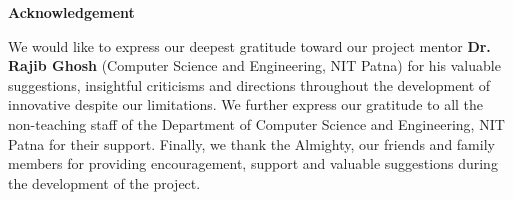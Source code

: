 \begin{center}
    \Large\textbf{Acknowledgement}
\end{center}

\vspace{1cm}

\large
We would like to express our deepest gratitude toward our project mentor \textbf{Dr. Rajib Ghosh} (Computer Science and Engineering, NIT Patna) for his valuable suggestions, insightful criticisms and directions throughout the development of innovative despite our limitations. 
We further express our gratitude to all the non-teaching staff of the Department of Computer Science and Engineering, NIT Patna for their support. Finally, we thank the Almighty, our friends and family members for providing encouragement, support and valuable suggestions during the development of the project.